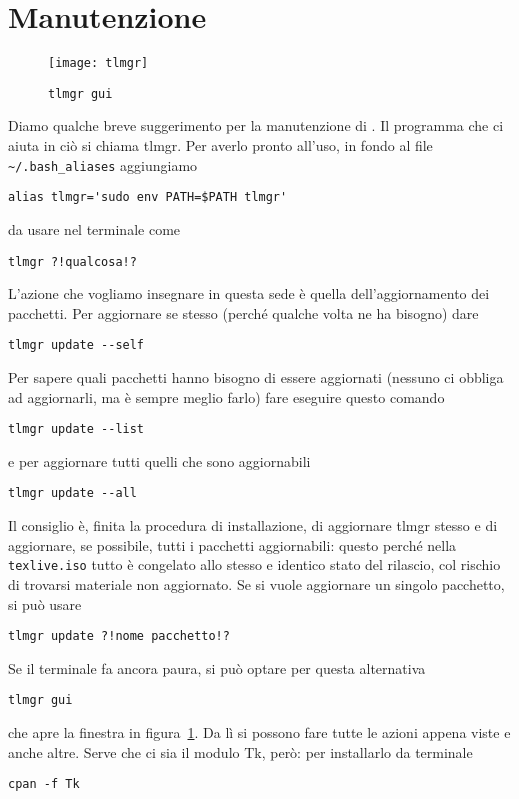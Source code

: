 
\section{Manutenzione}

\begin{figure}
\centering
\texttt{[image: tlmgr]}
\caption{\tt tlmgr gui}
\label{fig:gui}
\end{figure}

Diamo qualche breve suggerimento per la manutenzione di \texlive{}. Il programma che ci aiuta in ciò si chiama {\sf tlmgr}. Per averlo pronto all'uso, in fondo al file \lstinline£~/.bash_aliases£ aggiungiamo
\begin{lstlisting}
alias tlmgr='sudo env PATH=$PATH tlmgr'
\end{lstlisting}
da usare nel terminale come
\begin{lstlisting}
tlmgr ?!qualcosa!?
\end{lstlisting}
L'azione che vogliamo insegnare in questa sede è quella dell'aggiornamento dei pacchetti. Per aggiornare se stesso (perché qualche volta ne ha bisogno) dare
\begin{lstlisting}
tlmgr update --self
\end{lstlisting}
Per sapere quali pacchetti hanno bisogno di essere aggiornati (nessuno ci obbliga ad aggiornarli, ma è sempre meglio farlo) fare eseguire questo comando
\begin{lstlisting}
tlmgr update --list
\end{lstlisting}
e per aggiornare tutti quelli che sono aggiornabili
\begin{lstlisting}
tlmgr update --all
\end{lstlisting}
Il consiglio è, finita la procedura di installazione, di aggiornare {\sf tlmgr} stesso e di aggiornare, se possibile, tutti i pacchetti aggiornabili: questo perché nella \lstinline£texlive.iso£ tutto è congelato allo stesso e identico stato del rilascio, col rischio di trovarsi materiale non aggiornato. Se si vuole aggiornare un singolo pacchetto, si può usare
\begin{lstlisting}
tlmgr update ?!nome pacchetto!?
\end{lstlisting}

Se il terminale fa ancora paura, si può optare per questa alternativa
\begin{lstlisting}
tlmgr gui
\end{lstlisting}
che apre la finestra in figura~\ref{fig:gui}. Da lì si possono fare tutte le azioni appena viste e anche altre. Serve che ci sia il modulo {\sf Tk}, però: per installarlo da terminale
\begin{lstlisting}
cpan -f Tk
\end{lstlisting}
